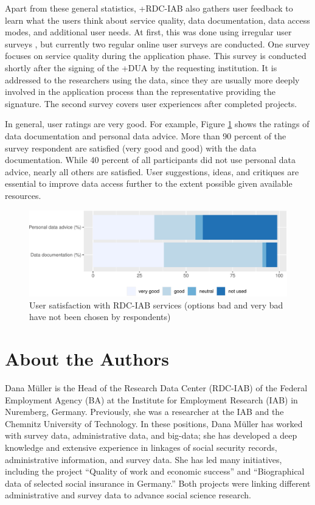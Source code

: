 \documentclass[
]{book}
\begin{document}
Apart from these general statistics, +RDC-IAB\textbar{} also gathers user feedback to learn what the users think about service quality, data documentation, data access modes, and additional user needs. At first, this was done using irregular user surveys \citep{wolter2018}, but currently two regular online user surveys are conducted. One survey focuses on service quality during the application phase. This survey is conducted shortly after the signing of the +DUA\textbar{} by the requesting institution. It is addressed to the researchers using the data, since they are usually more deeply involved in the application process than the representative providing the signature. The second survey covers user experiences after completed projects.

In general, user ratings are very good. For example, Figure \ref{fig:iabfig4} shows the ratings of data documentation and personal data advice. More than 90 percent of the survey respondent are satisfied (very good and good) with the data documentation. While 40 percent of all participants did not use personal data advice, nearly all others are satisfied. User suggestions, ideas, and critiques are essential to improve data access further to the extent possible given available resources.

\begin{figure}
\centering
\includegraphics{figures/iabfig4-1.pdf}
\caption{\label{fig:iabfig4}User satisfaction with RDC-IAB services (options bad and very bad have not been chosen by respondents)}
\end{figure}

\hypertarget{about-the-authors-1}{%
\section*{About the Authors}\label{about-the-authors-1}}

Dana Müller is the Head of the Research Data Center (RDC-IAB) of the Federal Employment Agency (BA) at the Institute for Employment Research (IAB) in Nuremberg, Germany. Previously, she was a researcher at the IAB and the Chemnitz University of Technology. In these positions, Dana Müller has worked with survey data, administrative data, and big-data; she has developed a deep knowledge and extensive experience in linkages of social security records, administrative information, and survey data. She has led many initiatives, including the project ``Quality of work and economic success'' and ``Biographical data of selected social insurance in Germany.'' Both projects were linking different administrative and survey data to advance social science research.
\end{document}
